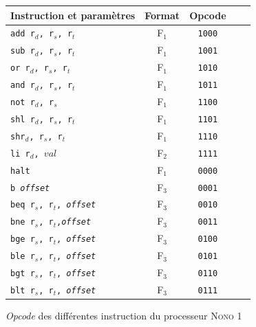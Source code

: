 \documentclass[a4paper]{article}
\begin{document}
			\begin{figure}
			\centering
			\begin{tabular}{|p{4cm}|c|c|c|c|}
				\hline Instruction et paramètres & Format & Opcode  \\ 
				\hline \texttt{add r$_{d}$, r$_{s}$, r$_{t}$} & F$_{1}$ & \texttt{1000} \\ 
				\hline \texttt{sub r$_{d}$, r$_{s}$, r$_{t}$} & F$_{1}$ & \texttt{1001}  \\ 
				\hline \texttt{or r$_{d}$, r$_{s}$, r$_{t}$} & F$_{1}$ & \texttt{1010}  \\ 
				\hline \texttt{and r$_{d}$, r$_{s}$, r$_{t}$} & F$_{1}$ & \texttt{1011}  \\ 
				\hline \texttt{not r$_{d}$, r$_{s}$} & F$_{1}$ & \texttt{1100} \\ 
				\hline \texttt{shl r$_{d}$, r$_{s}$, r$_{t}$} & F$_{1}$ & \texttt{1101} \\ 
				\hline \texttt{shr$_{d}$, r$_{s}$, r$_{t}$} & F$_{1}$ & \texttt{1110} \\ 
				\hline \texttt{li r$_{d}$, $val$} & F$_{2}$ & \texttt{1111} \\ 
				\hline \texttt{halt} & F$_{1}$ & \texttt{0000} \\ 
				\hline \texttt{b \textit{offset}} & F$_{3}$ & \texttt{0001} \\
				\hline \texttt{beq r$_{s}$, r$_{t}$, \textit{offset}} & F$_{3}$ & \texttt{0010} \\ 
				\hline \texttt{bne r$_{s}$, r$_{t}$,\textit{offset}} & F$_{3}$ & \texttt{0011} \\ 
				\hline \texttt{bge r$_{s}$, r$_{t}$, \textit{offset}} & F$_{3}$ & \texttt{0100} \\ 
				\hline \texttt{ble r$_{s}$, r$_{t}$, \textit{offset}} & F$_{3}$ & \texttt{0101} \\ 
				\hline \texttt{bgt r$_{s}$, r$_{t}$, \textit{offset}} & F$_{3}$ & \texttt{0110} \\ 
				\hline \texttt{blt r$_{s}$, r$_{t}$, \textit{offset}} & F$_{3}$ & \texttt{0111} \\ 
				\hline 
				\end{tabular}
			\caption{
				\label{tab_opcode}
				\textit{Opcode} des différentes instruction du processeur \textsc{Nono 1}
			}
			\end{figure}
			
\end{document}
